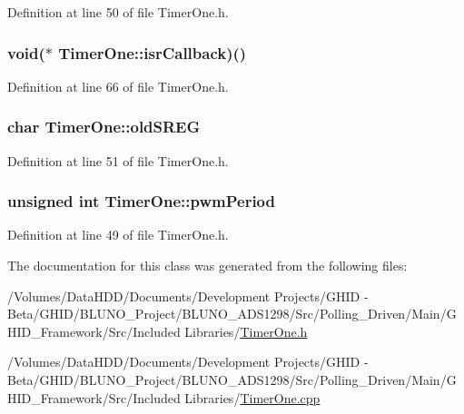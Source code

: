 \-Definition at line 50 of file \-Timer\-One.\-h.

\hypertarget{class_timer_one_aeed829a3f938c613579c10a015a3d1cb}{
\subsubsection[{isr\-Callback}]{\setlength{\rightskip}{0pt plus 5cm}void($\ast$ {\bf \-Timer\-One\-::isr\-Callback})()}}\label{class_timer_one_aeed829a3f938c613579c10a015a3d1cb}


\-Definition at line 66 of file \-Timer\-One.\-h.

\hypertarget{class_timer_one_ac71182fc3a2e44efbc796eb5260d3007}{
\subsubsection[{old\-S\-R\-E\-G}]{\setlength{\rightskip}{0pt plus 5cm}char {\bf \-Timer\-One\-::old\-S\-R\-E\-G}}}\label{class_timer_one_ac71182fc3a2e44efbc796eb5260d3007}


\-Definition at line 51 of file \-Timer\-One.\-h.

\hypertarget{class_timer_one_a6e5edd460d36e9c5c57cf647e86a3902}{
\subsubsection[{pwm\-Period}]{\setlength{\rightskip}{0pt plus 5cm}unsigned int {\bf \-Timer\-One\-::pwm\-Period}}}\label{class_timer_one_a6e5edd460d36e9c5c57cf647e86a3902}


\-Definition at line 49 of file \-Timer\-One.\-h.



\-The documentation for this class was generated from the following files\-:\begin{DoxyCompactItemize}
\item 
/\-Volumes/\-Data\-H\-D\-D/\-Documents/\-Development Projects/\-G\-H\-I\-D -\/ Beta/\-G\-H\-I\-D/\-B\-L\-U\-N\-O\-\_\-\-Project/\-B\-L\-U\-N\-O\-\_\-\-A\-D\-S1298/\-Src/\-Polling\-\_\-\-Driven/\-Main/\-G\-H\-I\-D\-\_\-\-Framework/\-Src/\-Included Libraries/\hyperlink{_timer_one_8h}{\-Timer\-One.\-h}\item 
/\-Volumes/\-Data\-H\-D\-D/\-Documents/\-Development Projects/\-G\-H\-I\-D -\/ Beta/\-G\-H\-I\-D/\-B\-L\-U\-N\-O\-\_\-\-Project/\-B\-L\-U\-N\-O\-\_\-\-A\-D\-S1298/\-Src/\-Polling\-\_\-\-Driven/\-Main/\-G\-H\-I\-D\-\_\-\-Framework/\-Src/\-Included Libraries/\hyperlink{_timer_one_8cpp}{\-Timer\-One.\-cpp}\end{DoxyCompactItemize}
